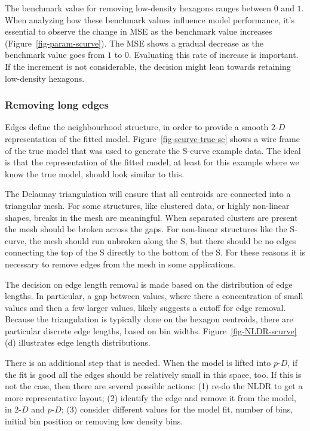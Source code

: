 \documentclass[
  12pt]{article}
\newcommand\pD{$p\text{-}D$}
\newcommand\gD{$2\text{-}D$}
\begin{document}
The benchmark value for removing low-density hexagons ranges between
\(0\) and \(1\). When analyzing how these benchmark values influence
model performance, it's essential to observe the change in MSE as the
benchmark value increases (Figure~\ref{fig-param-scurve}). The MSE shows
a gradual decrease as the benchmark value goes from \(1\) to \(0\).
Evaluating this rate of increase is important. If the increment is not
considerable, the decision might lean towards retaining low-density
hexagons.

\subsubsection{Removing long edges}\label{removing-long-edges}

Edges define the neighbourhood structure, in order to provide a smooth
\gD{} representation of the fitted model.
Figure~\ref{fig-scurve-true-sc} shows a wire frame of the true model
that was used to generate the S-curve example data. The ideal is that
the representation of the fitted model, at least for this example where
we know the true model, should look similar to this.

The Delaunay triangulation will ensure that all centroids are connected
into a triangular mesh. For some structures, like clustered data, or
highly non-linear shapes, breaks in the mesh are meaningful. When
separated clusters are present the mesh should be broken across the
gaps. For non-linear structures like the S-curve, the mesh should run
unbroken along the S, but there should be no edges connecting the top of
the S directly to the bottom of the S. For these reasons it is necessary
to remove edges from the mesh in some applications.

The decision on edge length removal is made based on the distribution of
edge lengths. In particular, a gap between values, where there a
concentration of small values and then a few larger values, likely
suggests a cutoff for edge removal. Because the triangulation is
typically done on the hexagon centroids, there are particular discrete
edge lengths, based on bin widths. Figure~\ref{fig-NLDR-scurve} (d)
illustrates edge length distributions.

There is an additional step that is needed. When the model is lifted
into \pD{}, if the fit is good all the edges should be relatively small
in this space, too. If this is not the case, then there are several
possible actions: (1) re-do the NLDR to get a more representative
layout; (2) identify the edge and remove it from the model, in \gD{} and
\pD{}; (3) consider different values for the model fit, number of bins,
initial bin position or removing low density bins.
\end{document}
